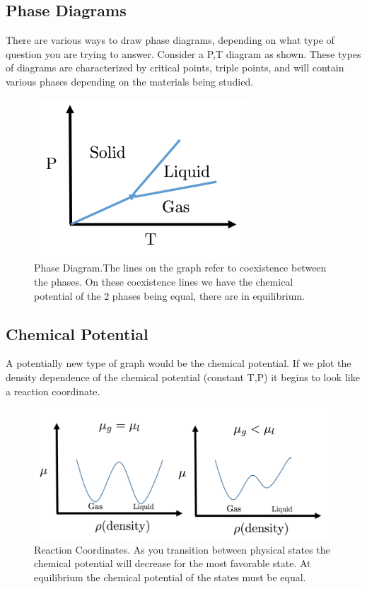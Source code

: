 \documentclass{article}
\begin{document}
\subsection*{Phase Diagrams}
There are various ways to draw phase diagrams, depending on what type of question you are trying to answer.
Consider a P,T diagram as shown. 
These types of diagrams are characterized by critical points, triple points, and will contain various phases depending on the materials being studied.

\begin{figure}[! h]
    \centering
    \includegraphics[width=8cm]{p_diag.png}
    \caption{Phase Diagram.The lines on the graph refer to coexistence between the phases. On these coexistence lines we have the chemical potential of the 2 phases being equal, there are in equilibrium.}
    \label{fig:p_diag}
\end{figure}

\subsection*{Chemical Potential}
A potentially new type of graph would be the chemical potential.
If we plot the density dependence of the chemical potential (constant T,P) it begins to look like a reaction coordinate. 

\begin{figure}[! h]
    \centering
    \includegraphics[width=14cm]{chem.png}
    \caption{Reaction Coordinates. As you transition between physical states the chemical potential will decrease for the most favorable state. At equilibrium the chemical potential of the states must be equal.}
    \label{fig:chem}
\end{figure}
\end{document}
